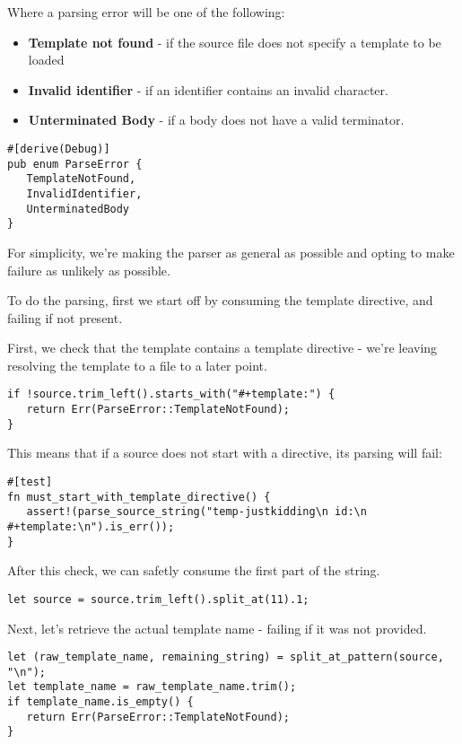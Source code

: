 \documentclass[11pt]{article}
\begin{document}
Where a parsing error will be one of the following:
\begin{itemize}
\item \textbf{\textbf{Template not found}} - if the source file does not specify a template to be loaded
\item \textbf{\textbf{Invalid identifier}} - if an identifier contains an invalid character.
\item \textbf{\textbf{Unterminated Body}} - if a body does not have a valid terminator.
\end{itemize}
\begin{verbatim}
#[derive(Debug)]
pub enum ParseError {
   TemplateNotFound,
   InvalidIdentifier,
   UnterminatedBody
}
\end{verbatim}
For simplicity, we're making the parser as general as possible and opting to make failure as unlikely as possible.

To do the parsing, first we start off by consuming the template directive, and failing if not present.

First, we check that the template contains a template directive - we're leaving resolving the template to a file to a later point.
\begin{verbatim}
if !source.trim_left().starts_with("#+template:") {
   return Err(ParseError::TemplateNotFound);
}
\end{verbatim}

This means that if a source does not start with a directive, its parsing will fail:
\begin{verbatim}
#[test]
fn must_start_with_template_directive() {
   assert!(parse_source_string("temp-justkidding\n id:\n #+template:\n").is_err());
}
\end{verbatim}

After this check, we can safetly consume the first part of the string.
\begin{verbatim}
let source = source.trim_left().split_at(11).1;
\end{verbatim}

Next, let's retrieve the actual template name - failing if it was not provided.
\begin{verbatim}
let (raw_template_name, remaining_string) = split_at_pattern(source, "\n");
let template_name = raw_template_name.trim();
if template_name.is_empty() {
   return Err(ParseError::TemplateNotFound);
}
\end{verbatim}
\end{document}
